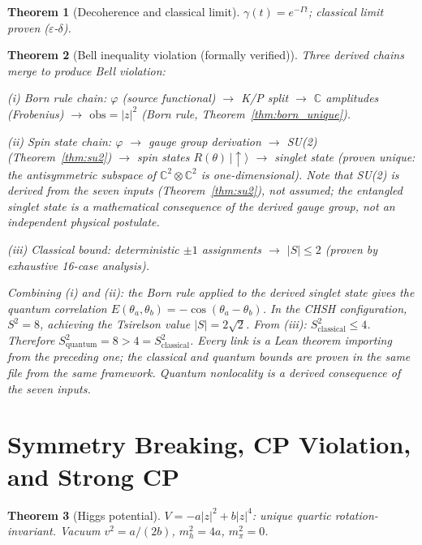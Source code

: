 \documentclass[12pt,a4paper]{article}
\newtheorem{theorem}{Theorem}
\begin{document}
\begin{theorem}[Decoherence and classical limit]
\label{thm:lindblad}
$\gamma(t) = e^{-\Gamma t}$; classical limit proven ($\varepsilon$-$\delta$).
\end{theorem}

\begin{theorem}[Bell inequality violation (formally verified)]
\label{thm:bell}
Three derived chains merge to produce Bell violation:

\emph{(i) Born rule chain:} $\varphi$ (source functional) $\to$ K/P split $\to$ $\mathbb{C}$ amplitudes (Frobenius) $\to$ $\mathrm{obs} = |z|^2$ (Born rule, Theorem~\ref{thm:born_unique}).

\emph{(ii) Spin state chain:} $\varphi$ $\to$ gauge group derivation $\to$ SU(2) (Theorem~\ref{thm:su2}) $\to$ spin states $R(\theta)\,|{\uparrow}\rangle$ $\to$ singlet state (proven unique: the antisymmetric subspace of $\mathbb{C}^2 \otimes \mathbb{C}^2$ is one-dimensional).  Note that SU(2) is \emph{derived} from the seven inputs (Theorem~\ref{thm:su2}), not assumed; the entangled singlet state is a mathematical consequence of the derived gauge group, not an independent physical postulate.

\emph{(iii) Classical bound:} deterministic $\pm 1$ assignments $\to$ $|S| \leq 2$ (proven by exhaustive 16-case analysis).

Combining (i) and (ii): the Born rule applied to the derived singlet state gives the quantum correlation $E(\theta_a,\theta_b) = -\cos(\theta_a - \theta_b)$. In the CHSH configuration, $S^2 = 8$, achieving the Tsirelson value $|S| = 2\sqrt{2}$.  From (iii): $S^2_{\mathrm{classical}} \leq 4$.  Therefore $S^2_{\mathrm{quantum}} = 8 > 4 = S^2_{\mathrm{classical}}$.  Every link is a Lean theorem importing from the preceding one; the classical and quantum bounds are proven in the same file from the same framework.  Quantum nonlocality is a derived consequence of the seven inputs.
\end{theorem}

\section{Symmetry Breaking, CP Violation, and Strong CP}

\begin{theorem}[Higgs potential]
\label{thm:higgs}
$V = -a|z|^2 + b|z|^4$: unique quartic rotation-invariant. Vacuum $v^2 = a/(2b)$, $m_h^2 = 4a$, $m_\pi^2 = 0$.
\end{theorem}
\end{document}
